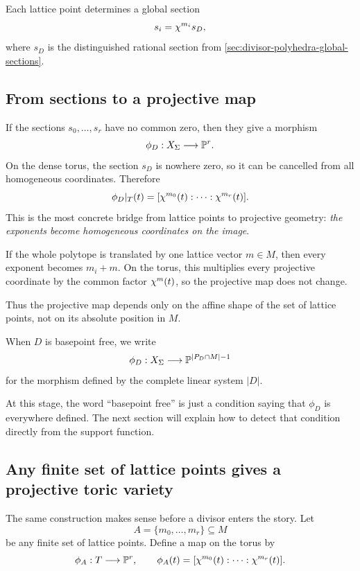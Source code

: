 Each lattice point determines a global section
\[
s_i=\chi^{m_i}s_D,
\]
where \(s_D\) is the distinguished rational section from
\cref{sec:divisor-polyhedra-global-sections}.

\subsection{From sections to a projective map}

If the sections \(s_0,\dots,s_r\) have no common zero, then they give
a morphism
\[
\phi_D:X_\Sigma\longrightarrow \mathbb{P}^r.
\]
On the dense torus, the section \(s_D\) is nowhere zero, so it can be
cancelled from all homogeneous coordinates. Therefore
\[
\phi_D|_T(t)=
[\chi^{m_0}(t):\cdots:\chi^{m_r}(t)].
\]
This is the most concrete bridge from lattice points to projective
geometry: \emph{the exponents become homogeneous coordinates on the
image}. 

\begin{observation}
If the whole polytope is translated by one lattice vector
\(m\in M\), then every exponent becomes \(m_i+m\). On the torus, this
multiplies every projective coordinate by the common factor
\(\chi^{m}(t)\), so the projective map does not change.

Thus the projective map depends only on the affine shape of the set of
lattice points, not on its absolute position in \(M\).
\end{observation}

\begin{definition}
When \(D\) is basepoint free, we write
\[
\phi_D:X_\Sigma\longrightarrow \mathbb{P}^{|P_D\cap M|-1}
\]
for the morphism defined by the complete linear system
\(|D|\).
\end{definition}

At this stage, the word ``basepoint free'' is just a condition saying
that \(\phi_D\) is everywhere defined. The next section will explain
how to detect that condition directly from the support function.

\subsection{Any finite set of lattice points gives a projective toric variety}

The same construction makes sense before a divisor enters the story.
Let
\[
A=\{m_0,\dots,m_r\}\subseteq M
\]
be any finite set of lattice points. Define a map on the torus by
\[
\phi_A:T\longrightarrow \mathbb{P}^r,
\qquad
\phi_A(t)=
[\chi^{m_0}(t):\cdots:\chi^{m_r}(t)].
\]

